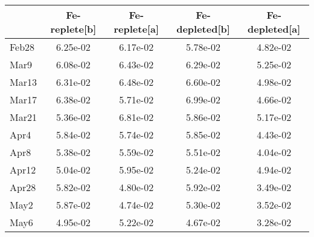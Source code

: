 \documentclass{article}
\begin{document}
\begin{table}[ht]
\centering
\begin{tabular}{lcccc}
  \hline
 & Fe-replete[b] & Fe-replete[a] & Fe-depleted[b] & Fe-depleted[a] \\ 
  \hline
Feb28 & 6.25e-02 & 6.17e-02 & 5.78e-02 & 4.82e-02 \\ 
  Mar9 & 6.08e-02 & 6.43e-02 & 6.29e-02 & 5.25e-02 \\ 
  Mar13 & 6.31e-02 & 6.48e-02 & 6.60e-02 & 4.98e-02 \\ 
  Mar17 & 6.38e-02 & 5.71e-02 & 6.99e-02 & 4.66e-02 \\ 
  Mar21 & 5.36e-02 & 6.81e-02 & 5.86e-02 & 5.17e-02 \\ 
  Apr4 & 5.84e-02 & 5.74e-02 & 5.85e-02 & 4.43e-02 \\ 
  Apr8 & 5.38e-02 & 5.59e-02 & 5.51e-02 & 4.04e-02 \\ 
  Apr12 & 5.04e-02 & 5.95e-02 & 5.24e-02 & 4.94e-02 \\ 
  Apr28 & 5.82e-02 & 4.80e-02 & 5.92e-02 & 3.49e-02 \\ 
  May2 & 5.87e-02 & 4.74e-02 & 5.30e-02 & 3.52e-02 \\ 
  May6 & 4.95e-02 & 5.22e-02 & 4.67e-02 & 3.28e-02 \\ 
   \hline
\end{tabular}
\end{table}
\end{document}
